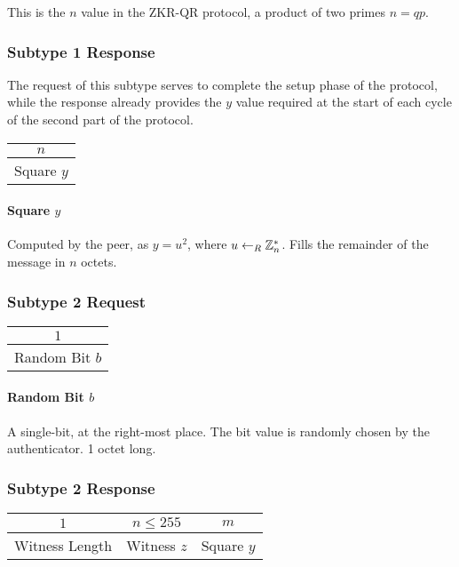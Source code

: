 This is the $n$ value in the ZKR-QR protocol, a product of two primes $n = qp$.


\subsubsection{Subtype 1 Response}
The request of this subtype serves to complete the setup phase of the protocol, while the response already provides the $y$ value required at the start of each cycle of the second part of the protocol.

\begin{center}
\begin{tabular}{|c|}
	\hline
	$n$ \\
	\hline
	Square $y$\\
	\hline
\end{tabular}
\end{center}

\bigskip

\paragraph{Square $y$} Computed by the peer, as $y = u^2$, where $u \leftarrow_R \Bbb{Z}_{n}^{*}$. Fills the remainder of the message in $n$ octets.

\subsubsection{Subtype 2 Request}

\begin{center}
\begin{tabular}{|c|}
	\hline
	$1$ \\
	\hline
	Random Bit $b$\\
	\hline
\end{tabular}
\end{center}

\paragraph{Random Bit $b$} A single-bit, at the right-most place. The bit value is randomly chosen by the authenticator. 1 octet long.

\subsubsection{Subtype 2 Response}

\begin{center}
\begin{tabular}{|c|c|c|}
	\hline
	$1$ & $n \le 255 $ & $m$\\
	\hline
	Witness Length & Witness $z$ & Square $y$\\ %
	\hline
\end{tabular}
\end{center}

